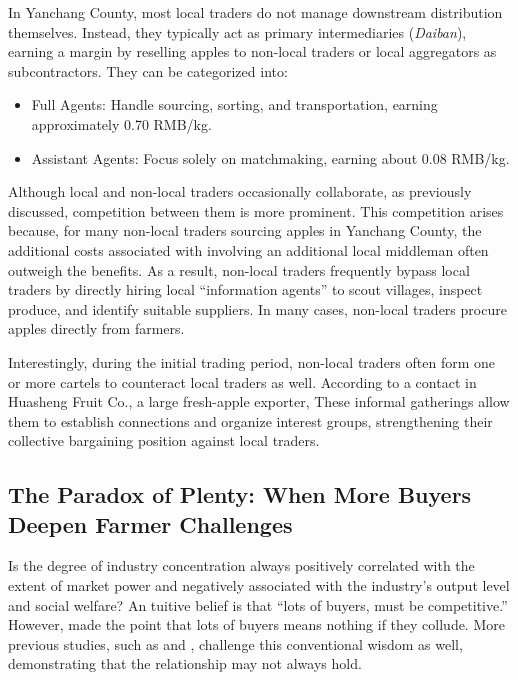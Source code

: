 In Yanchang County, most local traders do not manage downstream distribution themselves. Instead, they typically act as primary intermediaries (\textit{Daiban}), earning a margin by reselling apples to non-local traders or local aggregators as subcontractors. They can be categorized into:
\begin{itemize}
    \item Full Agents: Handle sourcing, sorting, and transportation, earning approximately 0.70 RMB/kg.
    \item Assistant Agents: Focus solely on matchmaking, earning about 0.08 RMB/kg.
\end{itemize}

Although local and non-local traders occasionally collaborate, as previously discussed, competition between them is more prominent. This competition arises because, for many non-local traders sourcing apples in Yanchang County, the additional costs associated with involving an additional local middleman often outweigh the benefits. As a result, non-local traders frequently bypass local traders by directly hiring local ``information agents'' to scout villages, inspect produce, and identify suitable suppliers. In many cases, non-local traders procure apples directly from farmers.

Interestingly, during the initial trading period, non-local traders often form one or more cartels to counteract local traders as well. According to a contact in Huasheng Fruit Co., a large fresh-apple exporter,  These informal gatherings allow them to establish connections and organize interest groups, strengthening their collective bargaining position against local traders.







\subsection{The Paradox of Plenty: When More Buyers Deepen Farmer Challenges}
\noindent Is the degree of industry concentration always positively correlated with the extent of market power and negatively associated with the industry's output level and social welfare? An tuitive belief is that ``lots of buyers, must be competitive.'' However, \cite{kopp2021farmers} made the point that lots of buyers means nothing if they collude. More previous studies, such as \cite{merel2017buyer} and \cite{crespi2012competition}, challenge this conventional wisdom as well, demonstrating that the relationship may not always hold.

